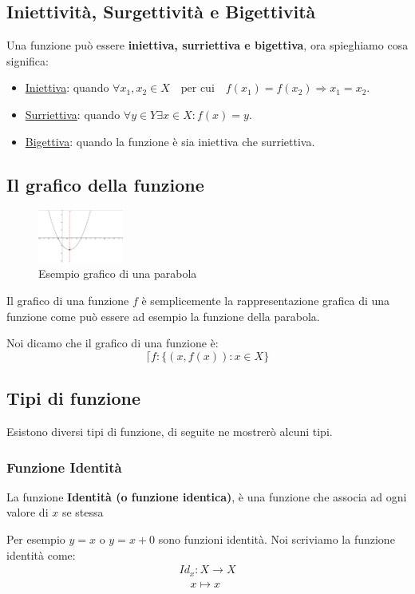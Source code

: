 \documentclass{article}
\begin{document}
\subsection{Iniettività, Surgettività e Bigettività}\label{sec:iniettiva_surriettiva_bigettiva}
Una funzione può essere \textbf{iniettiva, surriettiva e bigettiva}, ora spieghiamo cosa significa:
\begin{itemize}
        \item \underline{Iniettiva}: quando $ \forall x_1,x_2 \in X \quad \mbox{per cui} \quad f(x_1)=f(x_2) \Rightarrow x_1=x_2  $.   
        \item \underline{Surriettiva}: quando $ \forall y \in Y  \exists x \in X : f(x) = y $.   
        \item \underline{Bigettiva}: quando la funzione è sia iniettiva che surriettiva.  
\end{itemize}



\subsection{Il grafico della funzione}

\begin{figure}[!h]
\centering
        \includegraphics[width=0.25\textwidth]{esempio_grafico_funzione.jpg}
        \caption{Esempio grafico di una parabola}\label{fig:esempio_grafico_funzione}
\end{figure}


Il grafico di una funzione $f$ è semplicemente la rappresentazione grafica di una funzione come può essere ad esempio la funzione della parabola.

Noi dicamo che il grafico di una funzione è:
\begin{equation*}
        \lceil f : \{(x, f(x)) : x \in X\} 
\end{equation*}



\subsection{Tipi di funzione} 
Esistono diversi tipi di funzione, di seguite ne mostrerò alcuni tipi.


\subsubsection{Funzione Identità}
La funzione \textbf{Identità (o funzione identica)}, è una funzione che associa ad ogni valore di $ x $ se stessa \par
Per esempio $ y=x $ o $ y = x + 0 $ sono funzioni identità. \newline
Noi scriviamo la funzione identità come:
\begin{align*}
        Id_x : X \to X \\
        \quad x \mapsto x
\end{align*}
\end{document}
